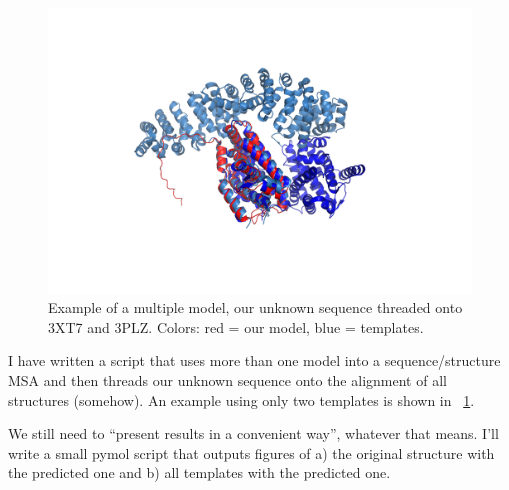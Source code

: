 \documentclass[12pt,a4paper,notitlepage,onecolumn]{article}
\title{\Title}
\author{\Author}
\date{\today}
\begin{document}
\maketitle

\begin{figure}[h!]
 \begin{center}
  \includegraphics[width=0.8\linewidth]{1yje_A-multiple_n_2.png}
  \caption{Example of a multiple model, our unknown sequence threaded onto 3XT7 and 3PLZ. Colors: red = our model, blue = templates.}
  \label{fig:1yje_A-multiple_n_2}
 \end{center}
\end{figure}
I have written a script that uses more than one model into a sequence/structure MSA and then threads our unknown sequence onto the alignment of all structures (somehow). An example using only two templates is shown in \figurename~\ref{fig:1yje_A-multiple_n_2}.

We still need to ``present results in a convenient way'', whatever that means. I'll write a small pymol script that outputs figures of a) the original structure with the predicted one and b) all templates with the predicted one.
\end{document}
